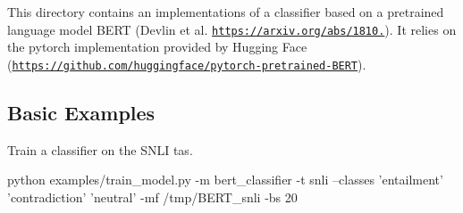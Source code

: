 This directory contains an implementations of a classifier based on a pretrained language model B\+E\+RT (Devlin et al. \href{https://arxiv.org/abs/1810.04805}{\tt https\+://arxiv.\+org/abs/1810.}). It relies on the pytorch implementation provided by Hugging Face (\href{https://github.com/huggingface/pytorch-pretrained-BERT}{\tt https\+://github.\+com/huggingface/pytorch-\/pretrained-\/\+B\+E\+RT}).

\subsection*{Basic Examples}

Train a classifier on the S\+N\+LI tas. 
\begin{DoxyCode}
python examples/train\_model.py -m bert\_classifier -t snli --classes 'entailment' 'contradiction' 'neutral'
       -mf /tmp/BERT\_snli -bs 20
\end{DoxyCode}
 